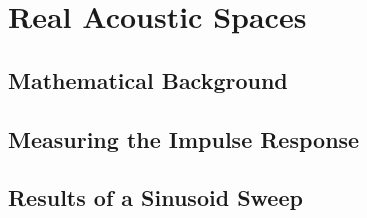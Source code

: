 \chapter{Real Acoustic Spaces}
\section{Mathematical Background}
\section{Measuring the Impulse Response}
\section{Results of a Sinusoid Sweep}
